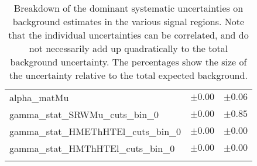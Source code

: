 \begin{table}
\begin{center}
\begin{tabular*}{\textwidth}{@{\extracolsep{\fill}}lcc}
alpha\_matMu         & $\pm 0.00$          & $\pm 0.06$       \\
gamma\_stat\_SRWMu\_cuts\_bin\_0         & $\pm 0.00$          & $\pm 0.85$       \\
gamma\_stat\_HMEThHTEl\_cuts\_bin\_0         & $\pm 0.00$          & $\pm 0.00$       \\
gamma\_stat\_HMThHTEl\_cuts\_bin\_0         & $\pm 0.00$          & $\pm 0.00$       \\
\noalign{\smallskip}\hline\noalign{\smallskip}
\end{tabular*}
\end{center}
\caption[Breakdown of uncertainty on background estimates]{
Breakdown of the dominant systematic uncertainties on background estimates in the various signal regions.
Note that the individual uncertainties can be correlated, and do not necessarily add up quadratically to 
the total background uncertainty. The percentages show the size of the uncertainty relative to the total expected background.
\label{table.results.bkgestimate.uncertainties.SRWEl_SRWMu}}
\end{table}
%